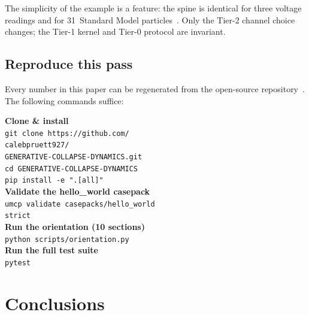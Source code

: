 \documentclass[
  aps,
  prd,
  twocolumn,
  superscriptaddress,
  nofootinbib,
  floatfix
]{revtex4-2}
\begin{document}
The simplicity of the example is a feature: the spine is identical
for three voltage readings and for 31~Standard Model
particles~\cite{paulus2025physicscoherence}.  Only the Tier-2
channel choice changes; the Tier-1 kernel and Tier-0 protocol are
invariant.

\subsection{Reproduce this pass}\label{sec:reproduce}

Every number in this paper can be regenerated from the open-source
repository~\cite{umcpmetadatarepo}.  The following commands suffice:

\begin{tcolorbox}[
  colback=black!4,
  colframe=black!60,
  boxrule=1.2pt,
  arc=2pt,
  left=6pt, right=6pt, top=6pt, bottom=6pt,
  title={\bfseries\sffamily Run This Now},
  coltitle=white,
  colbacktitle=black!70,
  fonttitle=\small,
]
\small
\textbf{Clone \& install}\\[2pt]
\texttt{git clone https://github.com/\\\hspace*{2em}calebpruett927/\\\hspace*{2em}GENERATIVE-COLLAPSE-DYNAMICS.git}\\[1pt]
\texttt{cd GENERATIVE-COLLAPSE-DYNAMICS}\\[1pt]
\texttt{pip install -e ".[all]"}\\[6pt]
%
\textbf{Validate the hello\_world casepack}\\[2pt]
\texttt{umcp validate casepacks/hello\_world} \\[1pt]
\texttt{\hspace*{2em}{-}{-}strict}\\[6pt]
%
\textbf{Run the orientation (10 sections)}\\[2pt]
\texttt{python scripts/orientation.py}\\[6pt]
%
\textbf{Run the full test suite}\\[2pt]
\texttt{pytest}
\end{tcolorbox}

\section{Conclusions}\label{sec:conclusions}
\end{document}
